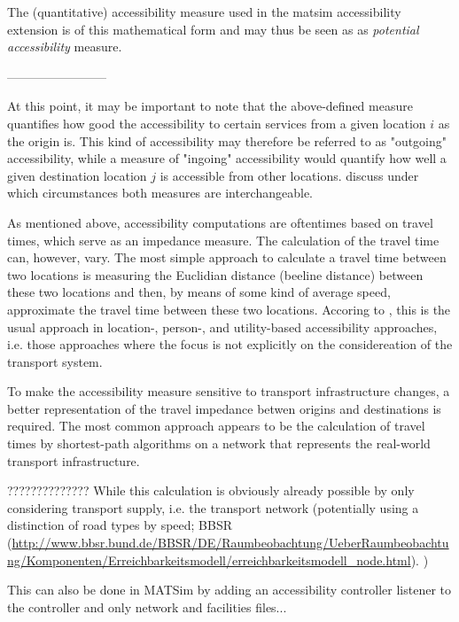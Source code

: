 The (quantitative) accessibility measure used in the \gls{matsim} accessibility extension is of this mathematical form and may thus be seen as as \textit{potential accessibility} measure.

------------------------

At this point, it may be important to note that the above-defined measure quantifies how good the accessibility to certain services from a given location $i$ as the origin is. This kind of accessibility may therefore be referred to as "outgoing" accessibility, while a measure of "ingoing" accessibility would quantify how well a given destination location $j$ is accessible from other locations. \citet{NicolaiNagel2012HiResAccessibilityMethodInBook} discuss under which circumstances both measures are interchangeable.

As mentioned above, accessibility computations are oftentimes based on travel times, which serve as an impedance measure. The calculation of the travel time can, however, vary. The most simple approach to calculate a travel time between two locations is measuring the Euclidian distance (beeline distance) between these two locations and then, by means of some kind of average speed, approximate the travel time between these two locations. Accoring to \citet{Geurs2004AccessibilityReview}, this is the usual approach in location-, person-, and utility-based accessibility approaches, i.e. those approaches where the focus is not explicitly on the considereation of the transport system.

To make the accessibility measure sensitive to transport infrastructure changes, a better representation of the travel impedance betwen origins and destinations is required. The most common approach appears to be the calculation of travel times by shortest-path algorithms on a network that represents the real-world transport infrastructure. 

??????????????
While this calculation is obviously already possible by only considering transport supply, i.e. the transport network (potentially using a distinction of road types by speed; \eg BBSR (\url{http://www.bbsr.bund.de/BBSR/DE/Raumbeobachtung/UeberRaumbeobachtung/Komponenten/Erreichbarkeitsmodell/erreichbarkeitsmodell_node.html}). )

This can also be done in MATSim by adding an accessibility controller listener to the controller and only network and facilities files...

